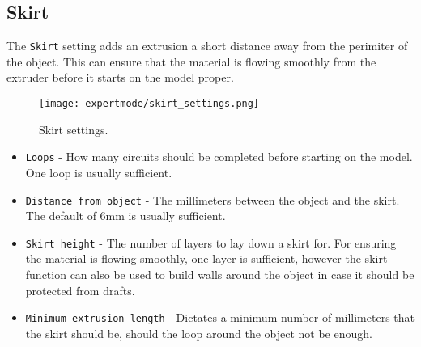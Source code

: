 
\subsection{Skirt} %
\label{sec:skirt}

The \texttt{Skirt} setting adds an extrusion a short distance away from the perimiter of the object.  This can ensure that the material is flowing smoothly from the extruder before it starts on the model proper.

\begin{figure}[H]
\centering
\texttt{[image: expertmode/skirt\_settings.png]}
\caption{Skirt settings.}
\label{fig:skirt_settings}
\end{figure}

\begin{itemize}
    \item \texttt{Loops} - How many circuits should be completed before starting on the model.  One loop is usually sufficient.
    \item \texttt{Distance from object} - The millimeters between the object and the skirt.  The default of 6mm is usually sufficient.
    \item \texttt{Skirt height} - The number of layers to lay down a skirt for.  For ensuring the material is flowing smoothly, one layer is sufficient, however the skirt function can also be used to build walls around the object in case it should be protected from drafts.
    \item \texttt{Minimum extrusion length} - Dictates a minimum number of millimeters that the skirt should be, should the loop around the object not be enough.
\end{itemize}

